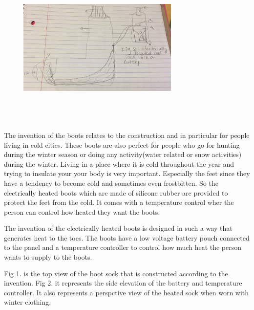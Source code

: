 \documentclass[11pt, english]{uspatent}
\begin{document}
\begin{figure}[h]
	\centering
	\includegraphics[width=8cm, height=8cm]{Fig2.jpg} 
	\label{fig:fig2}
\end{figure}



\patentParagraph The invention of the boots relates to the construction and in particular for people living in cold cities. These boots are also perfect for people who go for hunting during the winter season or doing any activity(water related or snow activities) during the winter.
\patentParagraph Living in a place where it is cold throughout the year and trying to insulate your your body is very important. Especially the feet since they have a tendency to become cold and sometimes even frostbitten.
\patentParagraph So the electrically heated boots which are made of silicone rubber are provided to protect the feet from the cold. It comes with a temperature control wher the person can control how heated they want the boots.


\patentParagraph The invention of the electrically heated boots is designed in such a way that generates heat to the toes. The boots have a low voltage battery pouch connected to the panel and a temperature controller to control how much heat the person wants to supply to the boots.


\patentParagraph Fig 1. is the top view of the boot sock that is constructed according to the invention.
\patentParagraph Fig 2. it represents the side elevation of the battery and temperature controller. It also represents a perspctive view of the heated sock when worn with winter clothing.
\end{document}
